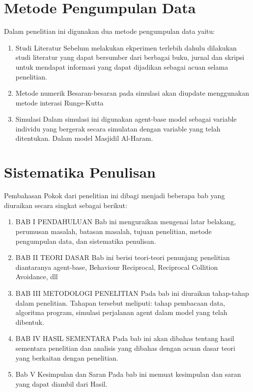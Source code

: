 \section{Metode Pengumpulan Data}\label{sec:metode}
\hspace{0.6cm}Dalam penelitian ini digunakan dua metode pengumpulan data yaitu:
\begin{enumerate} 
\item{Studi Literatur}
Sebelum melakukan ekperimen terlebih dahulu dilakukan studi literatur yang dapat bersumber dari berbagai buku, jurnal  dan skripsi untuk mendapat informasi yang dapat dijadikan sebagai acuan selama penelitian.
\item{Metode numerik}
Besaran-besaran pada simulasi akan diupdate menggunakan
metode interasi Runge-Kutta
\item{Simulasi}
Dalam simulasi ini digunakan agent-base model sebagai variable individu yang bergerak secara simulatan dengan variable yang telah ditentukan. Dalam model Masjidil Al-Haram.    

\end{enumerate}


\section{Sistematika Penulisan}\label{sec:sistematika}
\hspace{0.6cm}Pembahasan Pokok dari penelitian ini dibagi menjadi beberapa bab yang diuraikan secara singkat sebagai berikut:

\begin{enumerate}
\item{BAB I PENDAHULUAN
Bab ini menguraikan mengenai latar belakang, perumusan masalah, batasan masalah, tujuan penelitian, metode pengumpulan data, dan sistematika penulisan.}	

\item{BAB II TEORI DASAR
Bab ini berisi teori-teori penunjang penelitian diantaranya agent-base, Behaviour Reciprocal, Reciprocal Collition Avoidance, dll} 

\item{BAB III METODOLOGI PENELITIAN
Pada bab ini diuraikan tahap-tahap dalam penelitian. Tahapan tersebut meliputi: tahap pembacaan data, algoritma program, simulasi perjalanan agent  dalam model yang telah dibentuk.}

\item{BAB IV HASIL SEMENTARA
Pada bab ini akan dibahas tentang hasil sementara penelitian dan analisis yang dibahas dengan acuan dasar teori yang berkaitan dengan penelitian.}

\item{Bab V Kesimpulan dan Saran 
Pada bab ini memuat kesimpulan dan saran yang dapat diambil dari Hasil.
}
\end{enumerate}



%